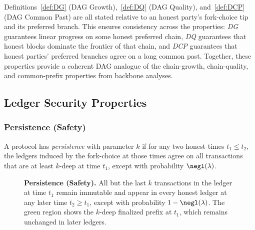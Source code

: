 \begin{remark}
Definitions~\ref{def:DG} (DAG Growth),~\ref{def:DQ} (DAG Quality), and~\ref{def:DCP} (DAG Common Past) are all stated relative to an honest party’s fork-choice tip and its preferred branch. This ensures consistency across the properties: \emph{DG} guarantees linear progress on some honest preferred chain, \emph{DQ} guarantees that honest blocks dominate the frontier of that chain, and \emph{DCP} guarantees that honest parties’ preferred branches agree on a long common past. Together, these properties provide a coherent DAG analogue of the chain-growth, chain-quality, and common-prefix properties from backbone analyses.
\end{remark}



\subsection{Ledger Security Properties}

\subsubsection{Persistence (Safety)}
\label{app:persistence}

A protocol has \emph{persistence} with parameter $k$ if for any two honest times $t_1\le t_2$,
the ledgers induced by the fork-choice at those times agree on all transactions that are at least $k$-deep at time $t_1$,
except with probability $\negl(\lambda)$.


\begin{figure}[htbp!]
\centering
{}
\caption{\textbf{Persistence (Safety).} 
\small 
All but the last $k$ transactions in the ledger at time $t_1$ remain immutable and appear in every honest ledger at any later time $t_2\ge t_1$, except with probability $1-\negl(\lambda)$. 
The green region shows the $k$-deep finalized prefix at $t_1$, which remains unchanged in later ledgers.}

\label{fig:persistence}
\end{figure}

